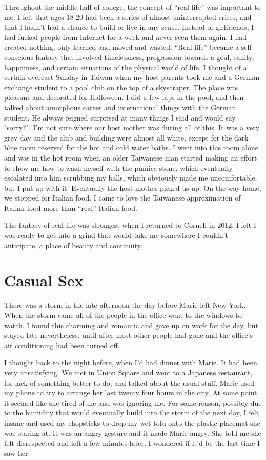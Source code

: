 \documentclass[12pt]{article}
\begin{document}
Throughout the middle half of college, the concept of ``real life'' was
important to me.  I felt that ages 18-20 had been a series of almost
uninterrupted crises, and that I hadn't had a chance to build or live in any
sense.  Instead of girlfriends, I had fucked people from Internet for a week and
never seen them again.  I had created nothing, only learned and moved and
wasted.  ``Real life'' became a self-conscious fantasy that involved
timelessness, progression towards a goal, sanity, happniness, and certain
situations of the physical world of life.  I thought of a certain overcast
Sunday in Taiwan when my host parents took me and a German exchange student to a
pool club on the top of a skyscraper.  The place was pleasant and decorated for
Halloween.  I did a few laps in the pool, and then talked about amorphous career
and international things with the German student.  He always feigned surprised
at many things I said and would say "sorry?".  I'm not sure where our host
mother was during all of this.  It was a very grey day and the club and building
were almost all white, except for the dark blue room reserved for the hot and
cold water baths.  I went into this room alone and was in the hot room when an
older Taiwanese man started making an effort to show me how to wash myself with
the pumice stone, which eventually escalated into him scrubbing my balls, which
obviously made me uncomfortable, but I put up with it.  Eventually the host
mother picked us up.  On the way home, we stopped for Italian food.  I came to
love the Taiwanese approximation of Italian food more than ``real'' Italian
food.

The fantasy of real life was strongest when I returned to Cornell in 2012.
I felt I was ready to get into a grind that would take me somewhere I couldn't
anticipate, a place of beauty and continuity.  

\section{Casual Sex}

There was a storm in the late afternoon the day before Marie left New York.
When the storm came all of the people in the office went to the windows to
watch.  I found this charming and romantic and gave up on work for the day, but
stayed late nevertheless, until after most other people had gone and the
office's air conditioning had been turned off.  

I thought back to the night before, when I'd had dinner with Marie.  It had been
very unsatisfying.  We met in Union Square and went to a Japanese restaurant,
for lack of something better to do, and talked about the usual stuff.  Marie
used my phone to try to arrange her last twenty four hours in the city.  At some
point it seemed like she tired of me and was ignoring me.  For some reason,
possibly due to the humidity that would eventually build into the storm of the
next day, I felt insane and used my chopsticks to drop my wet tofu onto the
plastic placemat she was staring at.  It was an angry gesture and it made Marie
angry.  She told me she felt disrespected and left a few minutes later.  I
wondered if it'd be the last time I saw her.
\end{document}
